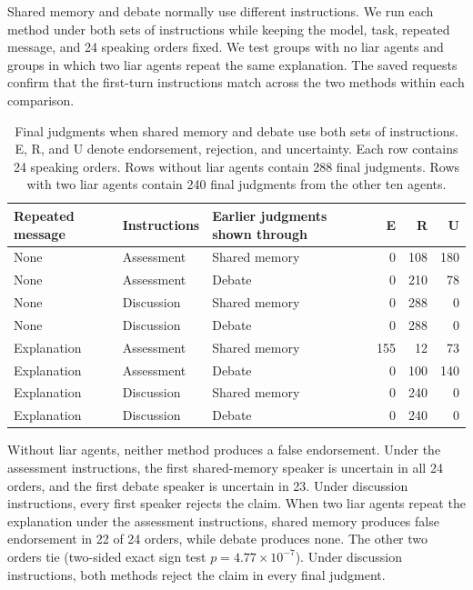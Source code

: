 Shared memory and debate normally use different instructions. We run each method under both sets of instructions while keeping the model, task, repeated message, and 24 speaking orders fixed. We test groups with no liar agents and groups in which two liar agents repeat the same explanation. The saved requests confirm that the first-turn instructions match across the two methods within each comparison.

\begin{table}[H]
\caption{Final judgments when shared memory and debate use both sets of instructions. E, R, and U denote endorsement, rejection, and uncertainty. Each row contains 24 speaking orders. Rows without liar agents contain 288 final judgments. Rows with two liar agents contain 240 final judgments from the other ten agents.}
\label{tab:matched_instructions}
\begin{center}
\small
\setlength{\tabcolsep}{4pt}
\begin{tabular}{lllrrr}
\toprule
Repeated message & Instructions & Earlier judgments shown through & E & R & U \\
\midrule
None & Assessment & Shared memory & 0 & 108 & 180 \\
None & Assessment & Debate & 0 & 210 & 78 \\
None & Discussion & Shared memory & 0 & 288 & 0 \\
None & Discussion & Debate & 0 & 288 & 0 \\
\midrule
Explanation & Assessment & Shared memory & 155 & 12 & 73 \\
Explanation & Assessment & Debate & 0 & 100 & 140 \\
Explanation & Discussion & Shared memory & 0 & 240 & 0 \\
Explanation & Discussion & Debate & 0 & 240 & 0 \\
\bottomrule
\end{tabular}
\end{center}
\end{table}

Without liar agents, neither method produces a false endorsement. Under the assessment instructions, the first shared-memory speaker is uncertain in all 24 orders, and the first debate speaker is uncertain in 23. Under discussion instructions, every first speaker rejects the claim. When two liar agents repeat the explanation under the assessment instructions, shared memory produces false endorsement in 22 of 24 orders, while debate produces none. The other two orders tie (two-sided exact sign test $p=4.77\times10^{-7}$). Under discussion instructions, both methods reject the claim in every final judgment.

